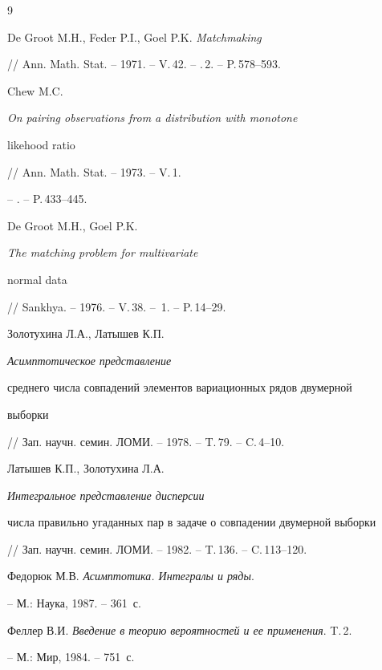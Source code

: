 \begin{thebibliography}{9}







De Groot M.H., Feder P.I., Goel P.K. {\em Matchmaking}


// Ann. Math. Stat. -- 1971. --  V.\,42. -- \No.\,2. -- P.\,578--593.




Chew M.C. {\em On pairing observations from a distribution with monotone


likehood ratio} // Ann. Math. Stat. --  1973. -- V.\,1.


-- . -- P.\,433--445.




De Groot M.H., Goel P.K. {\em The matching problem for multivariate


normal data} // Sankhya. -- 1976. -- V.\,38. -- \No\,1. -- P.\,14--29.




Золотухина Л.А., Латышев К.П. {\em Асимптотическое представление


среднего числа совпадений элементов вариационных рядов двумерной


выборки} // Зап. научн. семин. ЛОМИ. -- 1978. -- T.\,79. -- C.\,4--10.




Латышев К.П., Золотухина Л.А. {\em Интегральное представление дисперсии


числа правильно угаданных пар в задаче о совпадении двумерной выборки}


// Зап. научн. семин. ЛОМИ. -- 1982. -- T.\,136. -- C.\,113--120.




Федорюк М.В. {\em Асимптотика. Интегралы и ряды}.


-- М.: Наука, 1987. -- 361~с.




Феллер В.И. {\em Введение в теорию вероятностей и ее применения}. T.\,2.


-- М.: Мир, 1984. -- 751~с.





\end{thebibliography}





\vskip 0.5cm














\label{end}








